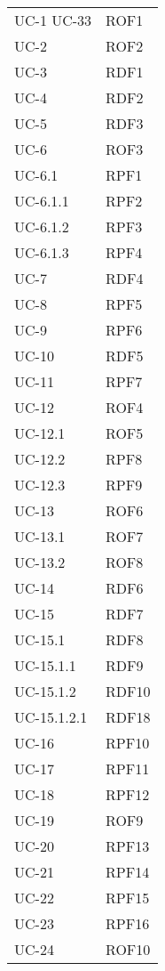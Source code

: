 \begin{longtable}{| p{5cm} | p{5cm} |}
		UC-1 \newline UC-33 & ROF1  \\
		\rowcolor{LightGray}
		UC-2 & ROF2 \\
		UC-3 & RDF1 \\
		\rowcolor{LightGray}
		UC-4 & RDF2 \\
		UC-5 & RDF3 \\
		\rowcolor{LightGray}
		UC-6 & ROF3 \\
		UC-6.1 & RPF1 \\
		\rowcolor{LightGray}
		UC-6.1.1 & RPF2 \\
		UC-6.1.2 & RPF3 \\
		\rowcolor{LightGray}
		UC-6.1.3 & RPF4 \\
		UC-7 & RDF4 \\
		\rowcolor{LightGray}
		UC-8 & RPF5 \\
		UC-9 & RPF6 \\
		\rowcolor{LightGray}
		UC-10 & RDF5 \\
		UC-11 & RPF7 \\
		\rowcolor{LightGray}
		UC-12 & ROF4 \\
		UC-12.1 & ROF5 \\
		\rowcolor{LightGray}
		UC-12.2 & RPF8 \\
		UC-12.3 & RPF9 \\
		\rowcolor{LightGray}
		UC-13 & ROF6 \\
		UC-13.1 & ROF7 \\
		\rowcolor{LightGray}
		UC-13.2 & ROF8 \\
		UC-14 & RDF6\\
		\rowcolor{LightGray}
		UC-15 & RDF7 \\
		UC-15.1 & RDF8\\
		\rowcolor{LightGray}
		UC-15.1.1 & RDF9\\
		UC-15.1.2 & RDF10\\
		\rowcolor{LightGray}
		UC-15.1.2.1 & RDF18\\
		UC-16 & RPF10\\
		UC-17 & RPF11\\
		\rowcolor{LightGray}
		UC-18 & RPF12 \\
		UC-19 & ROF9 \\
		\rowcolor{LightGray}
		UC-20 & RPF13 \\
		UC-21 & RPF14 \\
		\rowcolor{LightGray}
		UC-22 & RPF15 \\ 
		UC-23 & RPF16\\
		\rowcolor{LightGray}
		UC-24 & ROF10 \\

\end{longtable}
